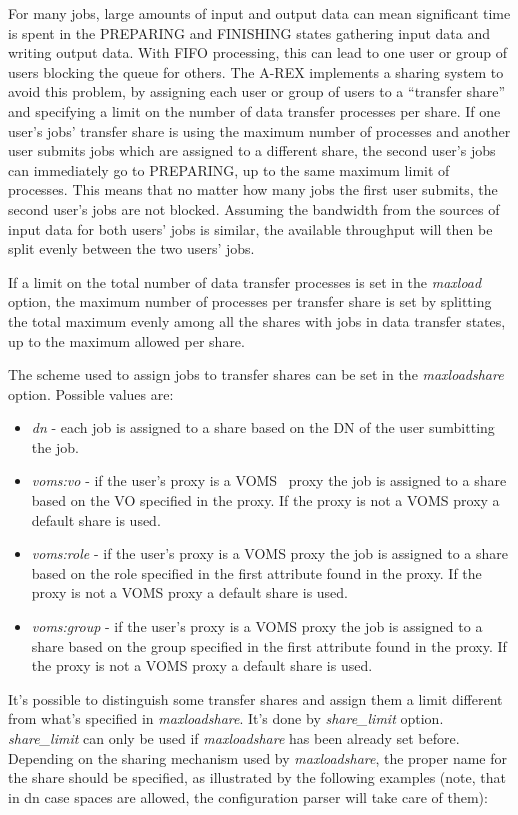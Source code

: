 \documentclass{article}                            %
\begin{document}
For many jobs, large amounts of input and output data can mean
significant time is spent in the PREPARING and FINISHING states
gathering input data and writing output data. With FIFO processing,
this can lead to one user or group of users blocking the queue for
others. The A-REX implements a sharing system to avoid this problem, by
assigning each user or group of users to a ``transfer share'' and
specifying a limit on the number of data transfer processes per
share. If one user's jobs' transfer share is using the maximum number
of processes and another user submits jobs which are assigned to a
different share, the second user's jobs can immediately go to
PREPARING, up to the same maximum limit of processes. This means that
no matter how many jobs the first user submits, the second user's jobs
are not blocked. Assuming the bandwidth from the sources of input data
for both users' jobs is similar, the available throughput will then be
split evenly between the two users' jobs.

If a limit on the total number of data transfer processes is set in
the \emph{maxload} option, the maximum number of processes per
transfer share is set by splitting the total maximum evenly among all
the shares with jobs in data transfer states, up to the maximum
allowed per share.

The scheme used to assign jobs to transfer shares can be set in the
\emph{maxloadshare} option. Possible values are:

\begin{itemize}
\item \emph{dn} - each job is assigned to a share based on the DN of
  the user sumbitting the job.
\item \emph{voms:vo} - if the user's proxy is a VOMS~\cite{voms} proxy
  the job is assigned to a share based on the VO specified in the
  proxy. If the proxy is not a VOMS proxy a default share is used.
\item \emph{voms:role} - if the user's proxy is a VOMS proxy the job
  is assigned to a share based on the role specified in the first
  attribute found in the proxy. If the proxy is not a VOMS proxy a
  default share is used.
\item \emph{voms:group} - if the user's proxy is a VOMS proxy the job is
  assigned to a share based on the group specified in the first
  attribute found in the proxy. If the proxy is not a VOMS proxy a
  default share is used.
\end{itemize}

It's possible to distinguish some transfer shares and assign them a limit
different from what's specified in \emph{maxloadshare}. It's done by
\emph{share\_limit} option. \emph{share\_limit} can only be used if 
\emph{maxloadshare} has been already set before. Depending on the 
sharing mechanism used by \emph{maxloadshare}, the proper name for the share
should be specified, as illustrated by the following examples (note, that
in dn case spaces are allowed, the configuration parser will take care of them):
\end{document}
